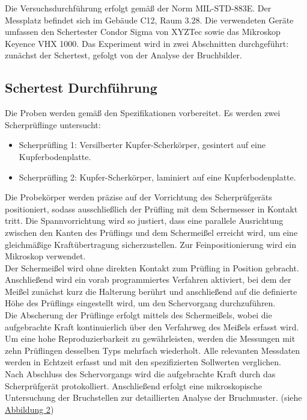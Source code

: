 Die Versuchsdurchführung erfolgt gemäß der Norm MIL-STD-883E. Der Messplatz befindet sich im Gebäude C12, Raum 3.28. Die verwendeten Geräte umfassen den Schertester Condor Sigma von XYZTec sowie das Mikroskop Keyence VHX 1000. Das Experiment wird in zwei Abschnitten durchgeführt: zunächst der Schertest, gefolgt von der Analyse der Bruchbilder.

\subsection{Schertest Durchführung}
Die Proben werden gemäß den Spezifikationen vorbereitet. Es werden zwei Scherprüflinge untersucht:
\begin{itemize}
    \item Scherprüfling 1: Versilberter Kupfer-Scherkörper, gesintert auf eine Kupferbodenplatte.
    \item     Scherprüfling 2: Kupfer-Scherkörper, laminiert auf eine Kupferbodenplatte.
\end{itemize}
Die Probekörper werden präzise auf der Vorrichtung des Scherprüfgeräts positioniert, sodass ausschließlich der Prüfling mit dem Schermesser in Kontakt tritt. Die Spannvorrichtung wird so justiert, dass eine parallele Ausrichtung zwischen den Kanten des Prüflings und dem Schermeißel erreicht wird, um eine gleichmäßige Kraftübertragung sicherzustellen. Zur Feinpositionierung wird ein Mikroskop verwendet.\\

Der Schermeißel wird ohne direkten Kontakt zum Prüfling in Position gebracht. Anschließend wird ein vorab programmiertes Verfahren aktiviert, bei dem der Meißel zunächst kurz die Halterung berührt und anschließend auf die definierte Höhe des Prüflings eingestellt wird, um den Schervorgang durchzuführen.\\

Die Abscherung der Prüflinge erfolgt mittels des Schermeißels, wobei die aufgebrachte Kraft kontinuierlich über den Verfahrweg des Meißels erfasst wird. Um eine hohe Reproduzierbarkeit zu gewährleisten, werden die Messungen mit zehn Prüflingen desselben Typs mehrfach wiederholt. Alle relevanten Messdaten werden in Echtzeit erfasst und mit den spezifizierten Sollwerten verglichen.\\

Nach Abschluss des Schervorgangs wird die aufgebrachte Kraft durch das Scherprüfgerät protokolliert. Anschließend erfolgt eine mikroskopische Untersuchung der Bruchstellen zur detaillierten Analyse der Bruchmuster. (siehe \hyperref[CondorSigma]{Abbildung 2})

